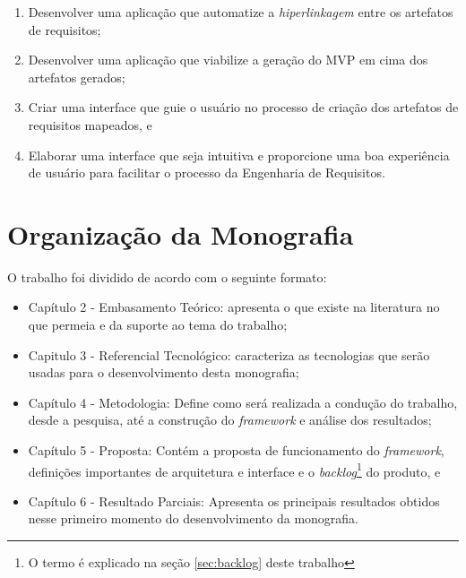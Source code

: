 \begin{enumerate}
    \item Desenvolver uma aplicação que automatize a \textit{hiperlinkagem} entre os artefatos de requisitos;
    \item Desenvolver uma aplicação que viabilize a geração do MVP em cima dos artefatos gerados;
    \item Criar uma interface que guie o usuário no processo de criação dos artefatos de requisitos mapeados, e
    \item Elaborar uma interface que seja intuitiva e proporcione uma boa experiência de usuário para facilitar o processo da Engenharia de Requisitos.
\end{enumerate}

\section{Organização da Monografia}

O trabalho foi dividido de acordo com o seguinte formato:

\begin{itemize}
    \item Capítulo 2 - Embasamento Teórico: apresenta o que existe na literatura no que permeia e da suporte ao tema do trabalho;
    \item Capitulo 3 - Referencial Tecnológico: caracteriza as tecnologias que serão usadas para o desenvolvimento desta monografia;
    \item Capítulo 4 - Metodologia: Define como será realizada a condução do trabalho, desde a pesquisa, até a construção do \textit{framework} e análise dos resultados;
    \item Capítulo 5 - Proposta: Contém a proposta de funcionamento do \textit{framework}, definições importantes de arquitetura e interface e o \textit{backlog}\footnote{O termo é explicado na seção \ref{sec:backlog} deste trabalho} do produto, e
    \item Capítulo 6 - Resultado Parciais: Apresenta os principais resultados obtidos nesse primeiro momento do desenvolvimento da monografia.
\end{itemize}